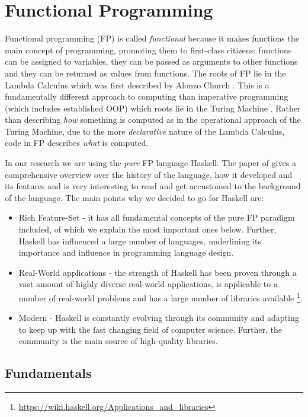 \section{Functional Programming}
\label{sec:fp}

Functional programming (FP) is called \textit{functional} because it makes functions the main concept of programming, promoting them to first-class citizens: functions can be assigned to variables, they can be passed as arguments to other functions and they can be returned as values from functions. The roots of FP lie in the Lambda Calculus which was first described by Alonzo Church \cite{church_unsolvable_1936}. This is a fundamentally different approach to computing than imperative programming (which includes established OOP) which roots lie in the Turing Machine \cite{turing_computable_1937}. Rather than describing \textit{how} something is computed as in the operational approach of the Turing Machine, due to the more \textit{declarative} nature of the Lambda Calculus, code in FP describes \textit{what} is computed.

In our research we are using the \textit{pure} FP language Haskell. The paper of \cite{hudak_history_2007} gives a comprehensive overview over the history of the language, how it developed and its features and is very interesting to read and get accustomed to the background of the language. The main points why we decided to go for Haskell are:

\begin{itemize}
	\item Rich Feature-Set - it has all fundamental concepts of the pure FP paradigm included, of which we explain the most important ones below. Further, Haskell has influenced a large number of languages, underlining its importance and influence in programming language design.
	\item Real-World applications - the strength of Haskell has been proven through a vast amount of highly diverse real-world applications, is applicable to a number of real-world problems \cite{osullivan_real_2008} and has a large number of libraries available \footnote{\url{https://wiki.haskell.org/Applications_and_libraries}}.
	\item Modern - Haskell is constantly evolving through its community and adapting to keep up with the fast changing field of computer science. Further, the community is the main source of high-quality libraries.
\end{itemize}

\subsection{Fundamentals}

